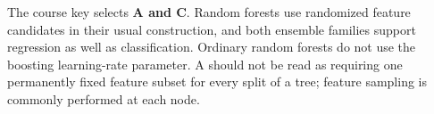 The course key selects \textbf{A and C}. Random forests use randomized feature candidates in their usual construction, and both ensemble families support regression as well as classification. Ordinary random forests do not use the boosting learning-rate parameter. A should not be read as requiring one permanently fixed feature subset for every split of a tree; feature sampling is commonly performed at each node.
